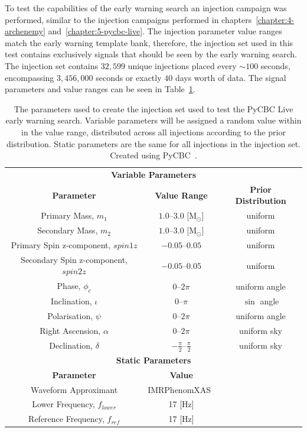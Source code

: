 To test the capabilities of the early warning search an injection campaign was performed, similar to the injection campaigns performed in chapters~\ref{chapter:4-archenemy} and~\ref{chapter:5-pycbc-live}. The injection parameter value ranges match the early warning template bank, therefore, the injection set used in this test contains exclusively signals that should be seen by the early warning search. The injection set contains $32,599$ unique injections placed every ${\sim}100$ seconds, encompassing $3,456,000$ seconds or exactly $40$ days worth of data. The signal parameters and value ranges can be seen in Table~\ref{6:tab:ew_inj_params}.
%
\begin{table}[ht]
    \centering
    \setlength{\tabcolsep}{4pt}
    \begin{tabular}{ccc}
        \toprule
        \multicolumn{3}{c}{\textbf{Variable Parameters}} \\
        \cmidrule(lr){1-3}
        \textbf{Parameter} & \textbf{Value Range} & \textbf{Prior Distribution} \\
        \midrule
        Primary Mass, $m_1$ & $1.0\text{--}3.0$ [$\text{M$_{\odot}$}$] & uniform \\
        Secondary Mass, $m_2$ & $1.0\text{--}3.0$ [$\text{M$_{\odot}$}$] & uniform \\
        Primary Spin z-component, $spin1z$ & $-0.05\text{--}0.05$ & uniform \\
        Secondary Spin z-component, $spin2z$ & $-0.05\text{--}0.05$ & uniform \\
        Phase, $\phi_{c}$ & $0\text{--}2\pi$ & uniform angle \\
        Inclination, $\iota$ & $0\text{--}\pi$ & $\sin$ angle \\
        Polarisation, $\psi$ & $0\text{--}2\pi$ & uniform angle \\
        Right Ascension, $\alpha$ & $0\text{--}2\pi$ & uniform sky \\
        Declination, $\delta$ & $-\frac{\pi}{2}\text{--}\frac{\pi}{2}$ & uniform sky \\
        \bottomrule
        \multicolumn{3}{c}{\textbf{Static Parameters}} \\
        \cmidrule(lr){1-3}
        \textbf{Parameter} & \textbf{Value} & \textbf{} \\
        \midrule
        Waveform Approximant & IMRPhenomXAS~\cite{IMRPhenomXAS:2020} & \\
        Lower Frequency, $f_{lower}$ & 17 [$\text{Hz}$] & \\
        Reference Frequency, $f_{ref}$ & 17 [$\text{Hz}$] & \\
        \bottomrule
    \end{tabular}
    \caption{The parameters used to create the injection set used to test the PyCBC Live early warning search. Variable parameters will be assigned a random value within in the value range, distributed across all injections according to the prior distribution. Static parameters are the same for all injections in the injection set. Created using PyCBC~\cite{PyCBC_package:2021}.}
    \label{6:tab:ew_inj_params}
\end{table}
%

